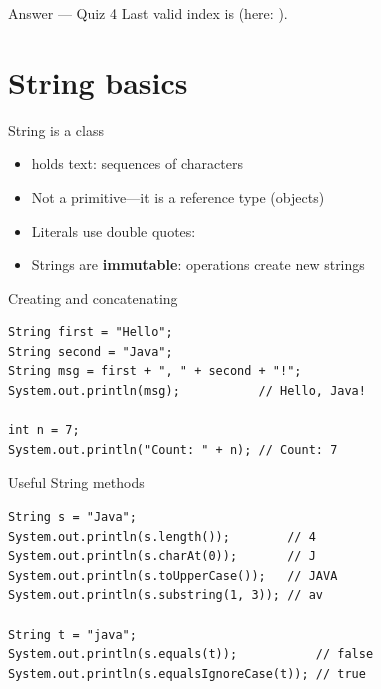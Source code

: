 \documentclass[aspectratio=169,11pt]{beamer}
\begin{document}
    \begin{frame}{Answer --- Quiz 4}
        \vspace{0.3em}
        Last valid index is  (here: ).
    \end{frame}

    \section{String basics}

    \begin{frame}{String is a class}
        \begin{itemize}
            \item {} holds text: sequences of characters
            \item Not a primitive---it is a reference type (objects)
            \item Literals use double quotes: 
            \item Strings are \textbf{immutable}: operations create new strings
        \end{itemize}
    \end{frame}

    \begin{frame}[fragile]{Creating and concatenating}
        \begin{lstlisting}
String first = "Hello";
String second = "Java";
String msg = first + ", " + second + "!";
System.out.println(msg);           // Hello, Java!

int n = 7;
System.out.println("Count: " + n); // Count: 7
        \end{lstlisting}
    \end{frame}

    \begin{frame}[fragile]{Useful String methods}
        \begin{lstlisting}
String s = "Java";
System.out.println(s.length());        // 4
System.out.println(s.charAt(0));       // J
System.out.println(s.toUpperCase());   // JAVA
System.out.println(s.substring(1, 3)); // av

String t = "java";
System.out.println(s.equals(t));           // false
System.out.println(s.equalsIgnoreCase(t)); // true
        \end{lstlisting}
    \end{frame}
\end{document}
